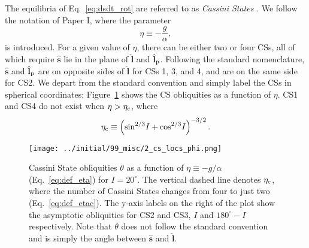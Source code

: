 \documentclass[
        fleqn,
        usenatbib,
    ]{mnras}
\newcommand*{\p}[1]{\left(#1\right)}
\newcommand*{\uv}[1]{\hat{\boldsymbol{\mathbf{#1}}}}
\begin{document}
The equilibria of Eq.~\eqref{eq:dsdt_rot} are referred to as \emph{Cassini
States} \citep[CSs;][]{colombo1966, peale1969}. We follow the notation of
Paper I, where the parameter
\begin{equation}
    \eta \equiv -\frac{g}{\alpha},\label{eq:def_eta}
\end{equation}
is introduced. For a given value of $\eta$, there can be either two or four CSs,
all of which require $\uv{s}$ lie in the plane of $\uv{l}$ and $\uv{l}_{\rm p}$.
Following the standard nomenclature, $\uv{s}$ and $\uv{l}_{\rm p}$ are on
opposite sides of $\uv{l}$ for CSs 1, 3, and 4, and are on the same side for
CS2. We depart from the standard convention and simply label the CSs in
spherical coordinates: Figure~\ref{fig:cs_locs} shows the CS obliquities as a
function of $\eta$. CS1 and CS4 do not exist when $\eta > \eta_{\rm c}$, where
\begin{equation}
    \eta_{\rm c} \equiv \p{\sin^{2/3}\!I + \cos^{2/3}\!I}^{-3/2}.
        \label{eq:def_etac}
\end{equation}
\begin{figure}
    \centering
    \texttt{[image: ../initial/99\_misc/2\_cs\_locs\_phi.png]}
    \caption{Cassini State obliquities $\theta$ as a function of $\eta \equiv
    -g/\alpha$ (Eq.~\ref{eq:def_eta}) for $I = 20^\circ$. The vertical dashed
    line denotes $\eta_{\rm c}$, where the number of Cassini States changes from
    four to just two (Eq.~\ref{eq:def_etac}). The y-axis labels on the right of
    the plot show the asymptotic obliquities for CS2 and CS3, $I$ and $180^\circ
    - I$ respectively. Note that $\theta$ does not follow the standard
    convention \citep[e.g.][]{colombo1966} and is simply the angle between
    $\uv{s}$ and $\uv{l}$.}\label{fig:cs_locs}
\end{figure}
\end{document}
